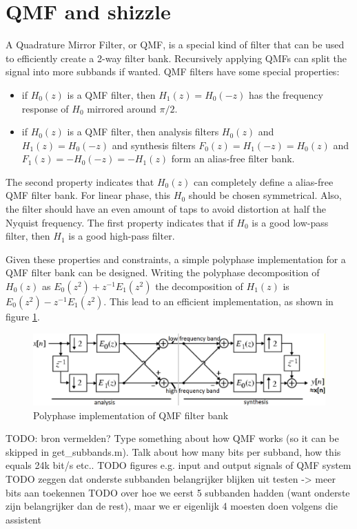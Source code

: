 \documentclass[a4paper]{article}
\begin{document}
\section{QMF and shizzle}
A Quadrature Mirror Filter, or QMF, is a special kind of filter that can be used to efficiently create a 2-way filter bank. Recursively applying QMFs can split the signal into more subbands if wanted. QMF filters have some special properties:
\begin{itemize}
\item if $H_0(z)$ is a QMF filter, then $H_1(z) = H_0(-z)$ has the frequency response of $H_0$ mirrored around $\pi/2$.
\item if $H_0(z)$ is a QMF filter, then analysis filters $H_0(z)$ and $H_1(z) = H_0(-z)$ and synthesis filters $F_0(z)=H_1(-z)=H_0(z)$ and $F_1(z)=-H_0(-z) = -H_1(z)$ form an alias-free filter bank.
\end{itemize}
The second property indicates that $H_0(z)$ can completely define a alias-free QMF filter bank. For linear phase, this $H_0$ should be chosen symmetrical. Also, the filter should have an even amount of taps to avoid distortion at half the Nyquist frequency. The first property indicates that if $H_0$ is a good low-pass filter, then $H_1$ is a good high-pass filter.

Given these properties and constraints, a simple polyphase implementation for a QMF filter bank can be designed. Writing the polyphase decomposition of $H_0(z)$ as $E_0(z^2) + z^{-1} E_1(z^2)$ the decomposition of $H_1(z)$ is $E_0(z^2) - z^{-1} E_1(z^2)$. This lead to an efficient implementation, as shown in figure \ref{fig:qmf}.

\begin{figure}[hbt]
\includegraphics[width = \textwidth]{qmf}
\caption{Polyphase implementation of QMF filter bank}
\label{fig:qmf}
\end{figure}

TODO: bron vermelden? 
Type something about how QMF works (so it can be skipped in get\_subbands.m). Talk about how many bits per subband, how this equals 24k bit/s etc..
TODO figures e.g. input and output signals of QMF system
TODO zeggen dat onderste subbanden belangrijker blijken uit testen -> meer bits aan toekennen
TODO over hoe we eerst 5 subbanden hadden (want onderste zijn belangrijker dan de rest), maar we er eigenlijk 4 moesten doen volgens die assistent
\end{document}
